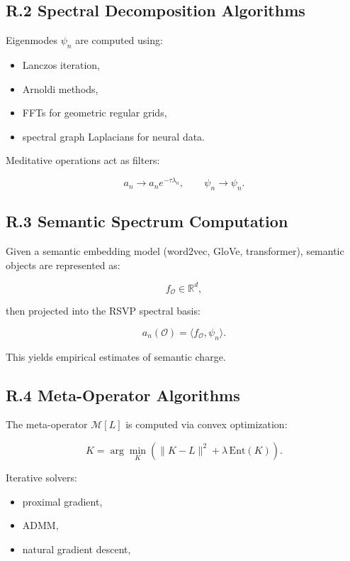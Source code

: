 \documentclass[12pt]{article}
\begin{document}
\subsection*{R.2 Spectral Decomposition Algorithms}

Eigenmodes $\psi_n$ are computed using:

\begin{itemize}
    \item Lanczos iteration,
    \item Arnoldi methods,
    \item FFTs for geometric regular grids,
    \item spectral graph Laplacians for neural data.
\end{itemize}

Meditative operations act as filters:

\[
a_n \to a_n e^{-\tau \lambda_n},
\qquad
\psi_n \to \psi_n.
\]

\subsection*{R.3 Semantic Spectrum Computation}

Given a semantic embedding model (word2vec, GloVe, transformer),
semantic objects are represented as:

\[
f_{\mathcal{O}} \in \mathbb{R}^d,
\]

then projected into the RSVP spectral basis:

\[
a_n(\mathcal{O}) = \langle f_{\mathcal{O}}, \psi_n \rangle.
\]

This yields empirical estimates of semantic charge.

\subsection*{R.4 Meta-Operator Algorithms}

The meta-operator $\mathcal{M}[L]$ is computed via convex optimization:

\[
K = \arg\min_{K}
\left(
\|K-L\|^2 + \lambda\, \mathrm{Ent}(K)
\right).
\]

Iterative solvers:

\begin{itemize}
\item proximal gradient,
\item ADMM,
\item natural gradient descent,
\end{itemize}
\end{document}
